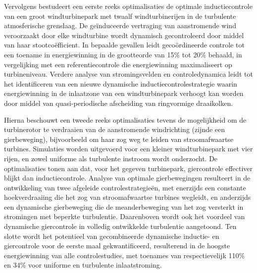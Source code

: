 Vervolgens bestudeert een eerste reeks optimalisaties de optimale inductiecontrole van een groot windturbinepark met twaalf windturbinerijen in de turbulente atmosferische grenslaag. De ge\"induceerde vertraging van aanstromende wind veroorzaakt door elke windturbine wordt dynamisch gecontroleerd door middel van haar stootco\"efficient. In bepaalde gevallen leidt geco\"ordineerde controle tot een toename in energiewinning in de grootteorde van 15\% tot 20\% behaald, in vergelijking met een referentiecontrole die energiewinning maximaliseert op turbineniveau. Verdere analyse van stromingsvelden en controledynamica leidt tot het identificeren van een nieuwe dynamische inductiecontrolestrategie waarin energiewinning in de inlaatzone van een windturbinepark verhoogt kan worden door middel van quasi-periodische afscheiding van ringvormige draaikolken. 

Hierna beschouwt een tweede reeks optimalisaties tevens de mogelijkheid om de turbinerotor te verdraaien van de aanstromende windrichting (zijnde een gierbeweging), bijvoorbeeld om haar zog weg te leiden van stroomafwaartse turbines. Simulaties worden uitgevoerd voor een kleiner windturbinepark met vier rijen, en zowel uniforme als turbulente instroom wordt onderzocht. De optimalisaties tonen aan dat, voor het gegeven turbinepark, giercontrole effectiver blijkt dan inductiecontrole. Analyse van optimale gierbewegingen resulteert in de ontwikkeling van twee afgeleide controlestrategie\"en, met enerzijds een constante hoekverdraaiing die het zog van stroomafwaartse turbines wegleidt, en anderzijds een dynamische gierbeweging die de meanderbeweging van het zog versterkt in stromingen met beperkte turbulentie. Daarenboven wordt ook het voordeel van dynamische giercontrole in volledig ontwikkelde turbulentie aangetoond. Ten slotte wordt het potentieel van gecombineerde dynamische inductie- en giercontrole voor de eerste maal gekwantificeerd, resulterend in de hoogste energiewinning van alle controlestudies, met toenames van respectievelijk 110\% en 34\% voor uniforme en turbulente inlaatstroming. 
\cleardoublepage

